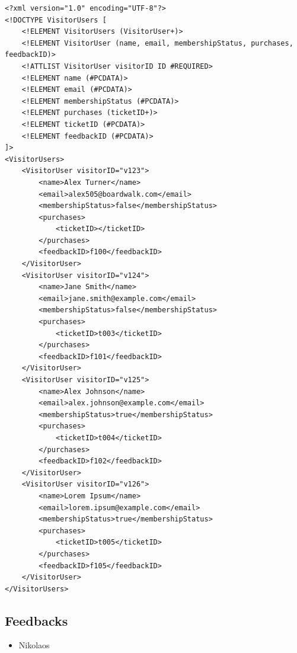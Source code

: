 \documentclass{article} %
\begin{document}
\begin{verbatim}
<?xml version="1.0" encoding="UTF-8"?>
<!DOCTYPE VisitorUsers [
    <!ELEMENT VisitorUsers (VisitorUser+)>
    <!ELEMENT VisitorUser (name, email, membershipStatus, purchases, feedbackID)>
    <!ATTLIST VisitorUser visitorID ID #REQUIRED>
    <!ELEMENT name (#PCDATA)>
    <!ELEMENT email (#PCDATA)>
    <!ELEMENT membershipStatus (#PCDATA)>
    <!ELEMENT purchases (ticketID+)>
    <!ELEMENT ticketID (#PCDATA)>
    <!ELEMENT feedbackID (#PCDATA)>
]>
<VisitorUsers>
    <VisitorUser visitorID="v123">
        <name>Alex Turner</name>
        <email>alex505@boardwalk.com</email>
        <membershipStatus>false</membershipStatus>
        <purchases>
            <ticketID></ticketID>
        </purchases>
        <feedbackID>f100</feedbackID>
    </VisitorUser>
    <VisitorUser visitorID="v124">
        <name>Jane Smith</name>
        <email>jane.smith@example.com</email>
        <membershipStatus>false</membershipStatus>
        <purchases>
            <ticketID>t003</ticketID>
        </purchases>
        <feedbackID>f101</feedbackID>
    </VisitorUser>
    <VisitorUser visitorID="v125">
        <name>Alex Johnson</name>
        <email>alex.johnson@example.com</email>
        <membershipStatus>true</membershipStatus>
        <purchases>
            <ticketID>t004</ticketID>
        </purchases>
        <feedbackID>f102</feedbackID>
    </VisitorUser>
    <VisitorUser visitorID="v126">
        <name>Lorem Ipsum</name>
        <email>lorem.ipsum@example.com</email>
        <membershipStatus>true</membershipStatus>
        <purchases>
            <ticketID>t005</ticketID>
        </purchases>
        <feedbackID>f105</feedbackID>
    </VisitorUser>
</VisitorUsers>
\end{verbatim}

\subsection{Feedbacks}
\begin{itemize}
    \item Nikolaos
\end{itemize}
\end{document}
